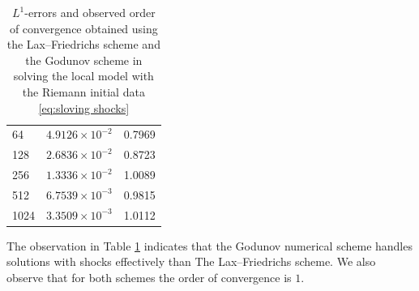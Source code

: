 \begin{table}[H]
\begin{minipage}{0.5\textwidth}
\begin{tabular}{ |p{1.5cm}||p{2.2cm}| |p{1.5cm}| }
            64              & $4.9126 \times 10^{-2}$ & 0.7969       \\
            128             & $2.6836 \times 10^{-2}$ & 0.8723       \\
            256             & $1.3336 \times 10^{-2}$ & 1.0089       \\
            512             & $6.7539 \times 10^{-3}$ & 0.9815       \\
            1024            & $3.3509 \times 10^{-3}$ & 1.0112       \\
            \hline
        \end{tabular}
        \caption*{(b) Godunov scheme}
    \end{minipage}
    \caption{$L^{1}$-errors and observed order of convergence obtained using the Lax--Friedrichs scheme and the Godunov scheme in solving the local model with the Riemann initial data \eqref{eq:sloving shocks}}
    \label{tab:table_2}
\end{table}
The observation in Table \ref{tab:table_2} indicates that the Godunov numerical scheme handles solutions with shocks effectively than The Lax--Friedrichs scheme. We also observe that for both schemes the order of convergence is $1$.


